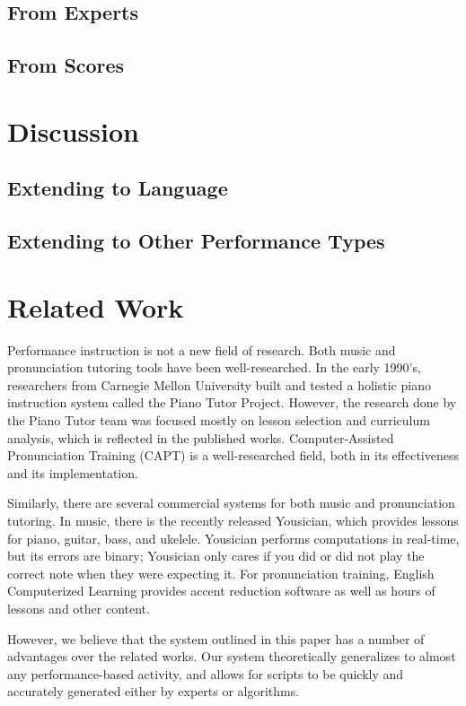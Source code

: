 \documentclass[twocolumn]{article}
\begin{document}
\subsection{From Experts}

\subsection{From Scores}

\section{Discussion}

\subsection{Extending to Language}

\subsection{Extending to Other Performance Types}

\section{Related Work}

Performance instruction is not a new field of research. Both music and pronunciation tutoring tools have been well-researched. In the early 1990’s, researchers from Carnegie Mellon University built and tested a holistic piano instruction system called the Piano Tutor Project. However, the research done by the Piano Tutor team was focused mostly on lesson selection and curriculum analysis, which is reflected in the published works. Computer-Assisted Pronunciation Training (CAPT) is a well-researched field, both in its effectiveness and its implementation.

Similarly, there are several commercial systems for both music and pronunciation tutoring. In music, there is the recently released Yousician, which provides lessons for piano, guitar, bass, and ukelele. Yousician performs computations in real-time, but its errors are binary; Yousician only cares if you did or did not play the correct note when they were expecting it. For pronunciation training, English Computerized Learning provides accent reduction software as well as hours of lessons and other content.

However, we believe that the system outlined in this paper has a number of advantages over the related works. Our system theoretically generalizes to almost any performance-based activity, and allows for scripts to be quickly and accurately generated either by experts or algorithms.
\end{document}
